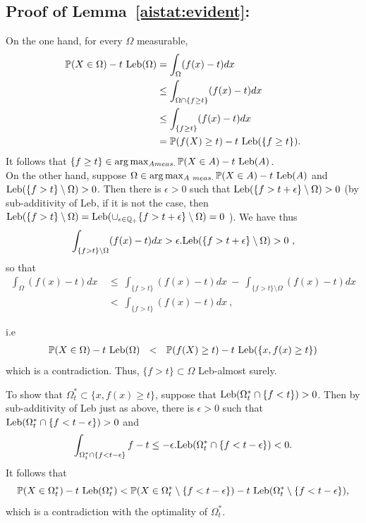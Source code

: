 \subsection*{Proof of Lemma~\ref{aistat:evident}:}

On the one hand, for every $\Omega$ measurable, 
\begin{align*}
\mathbb{P}(X \in \Omega)-t~\text{Leb}(\Omega)&=\int_\Omega(f(x)-t)dx \\&\le \int_{\Omega \cap \{ f \ge t\}}(f(x)-t)dx \\&\le \int_{\{f \ge t\}}(f(x)-t)dx\\&=\mathbb{P}(f(X) \ge t)-t~\text{Leb}(\{ f \ge t\}).
\end{align*}
\noindent
It follows that $\{ f \ge t\} \in \arg\max_{A meas.}\mathbb{P}(X \in A)-t~\text{Leb}(A) $.\\

On the other hand, suppose $\Omega \in \arg\max_{A~ meas.}\mathbb{P}(X \in A)-t~\text{Leb}(A)$ and $\text{Leb}(\{f>t\} \setminus \Omega)>0$. Then there is $\epsilon > 0$ such that $\text{Leb}(\{f>t+\epsilon\} \setminus \Omega)>0$ (by sub-additivity of Leb, if it is not the case, then $ \text{Leb}(\{f>t\} \setminus \Omega) = \text{Leb}(\cup_{\epsilon \in \mathbb{Q}_+}\{ f>t+\epsilon\} \setminus \Omega)=0$ ). We have thus $$\int_{\{f>t\} \setminus \Omega} (f(x)-t)dx > \epsilon.\text{Leb}(\{f > t+ \epsilon\} \setminus \Omega) > 0~,$$ so that 
\begin{align*}
\int_{\Omega}(f(x)-t)dx &~\le~ \int_{ \{f>t\} }(f(x)-t)dx ~-~ \int_{ \{f>t \} \setminus \Omega}(f(x)-t)dx \\
&~<~ \int_{\{f>t\}}(f(x)-t)dx~,
\end{align*}

 i.e  
\begin{align*}
\mathbb{P}(X \in \Omega)-t~\text{Leb}(\Omega) ~~<~~ \mathbb{P}(f(X) \ge t) - t~\text{Leb}(\{x,f(x) \ge t\})   
\end{align*}
which is a contradiction. Thus, $\{f>t\} \subset \Omega$ Leb-almost surely.

To show that $ \Omega^*_t \subset \{x, f(x) \ge t\}$, suppose that $\text{Leb}(\Omega^*_t \cap \{f<t\}) > 0$. Then by sub-additivity of Leb just as above, there is $\epsilon >0$ such that $\text{Leb}(\Omega^*_t \cap \{f<t-\epsilon\}) > 0$ and $$\int_{\Omega^*_t \cap \{f<t-\epsilon\}} f-t \le -\epsilon.\text{Leb}(\Omega^*_t \cap \{f<t-\epsilon\})<0.$$ It follows that $$\mathbb{P}(X \in \Omega^*_t)-t~\text{Leb}(\Omega^*_t) < \mathbb{P}(X \in \Omega^*_t \setminus \{f<t-\epsilon\})-t~\text{Leb}(\Omega^*_t \setminus \{f<t-\epsilon\}),$$ which is a contradiction with the optimality of $\Omega_t^*$.



